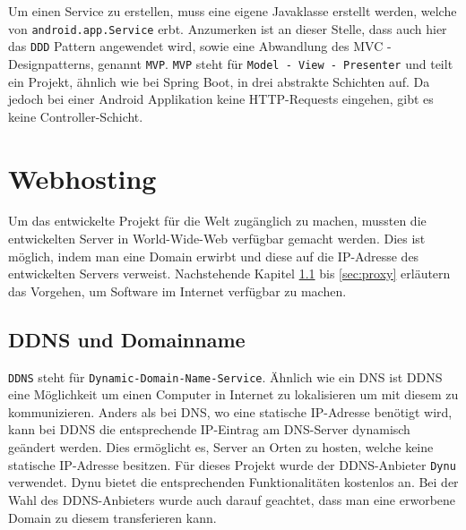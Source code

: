 \documentclass[paper=a4,12pt]{scrreprt}
\begin{document}
Um einen Service zu erstellen, muss eine eigene Javaklasse erstellt werden, welche von \texttt{android.app.Service} erbt.\newline
Anzumerken ist an dieser Stelle, dass auch hier das \texttt{DDD} Pattern angewendet wird, sowie eine Abwandlung des MVC - Designpatterns, genannt \texttt{MVP}\cite{mvp}.
\texttt{MVP} steht für \texttt{Model - View - Presenter} und teilt ein Projekt, ähnlich wie bei Spring Boot, in drei abstrakte Schichten auf.
Da jedoch bei einer Android Applikation keine HTTP-Requests eingehen, gibt es keine Controller-Schicht.\newline


\chapter{Webhosting}

Um das entwickelte Projekt für die Welt zugänglich zu machen, mussten die entwickelten Server in World-Wide-Web verfügbar gemacht werden. Dies ist möglich, indem man eine Domain erwirbt und diese auf die IP-Adresse des entwickelten Servers verweist.\newline
Nachstehende Kapitel \ref{sec:ddns} bis \ref{sec:proxy} erläutern das Vorgehen, um Software im Internet verfügbar zu machen.\newline

\section{DDNS und Domainname}
\label{sec:ddns}

\texttt{DDNS} steht für \texttt{Dynamic-Domain-Name-Service}. Ähnlich wie ein DNS ist DDNS eine Möglichkeit um einen Computer in Internet zu lokalisieren um mit diesem zu kommunizieren. Anders als bei DNS, wo eine statische IP-Adresse benötigt wird, kann bei DDNS die entsprechende IP-Eintrag am DNS-Server dynamisch geändert werden. Dies ermöglicht es, Server an Orten zu hosten, welche keine statische IP-Adresse besitzen.\newline
Für dieses Projekt wurde der DDNS-Anbieter \texttt{Dynu} verwendet. Dynu bietet die entsprechenden Funktionalitäten kostenlos an.\newline
Bei der Wahl des DDNS-Anbieters wurde auch darauf geachtet, dass man eine erworbene Domain zu diesem transferieren kann.\newline
\end{document}
